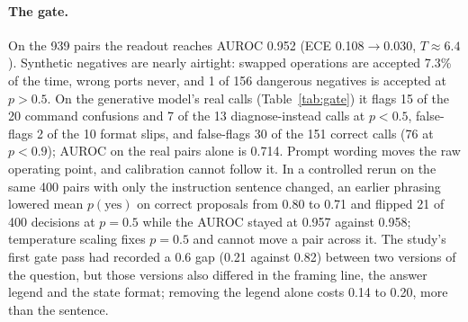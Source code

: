 \documentclass[11pt]{article}
\begin{document}
\paragraph{The gate.} On the 939 pairs the readout reaches AUROC 0.952 (ECE 0.108$\to$0.030,
$T\approx6.4$). Synthetic negatives are nearly airtight: swapped operations are accepted 7.3\%
of the time, wrong ports never, and 1 of 156 dangerous negatives is accepted at $p>0.5$. On the
generative model's real calls (Table~\ref{tab:gate}) it flags 15 of the 20 command confusions
and 7 of the 13 diagnose-instead calls at $p<0.5$, false-flags 2 of the 10 format slips, and
false-flags 30 of the 151 correct calls (76 at $p<0.9$); AUROC on the real pairs alone is 0.714.
Prompt wording moves the raw operating point, and calibration cannot follow it. In a controlled
rerun on the same 400 pairs with only the instruction sentence changed, an earlier phrasing
lowered mean $p(\text{yes})$ on correct proposals from 0.80 to 0.71 and flipped 21 of 400
decisions at $p=0.5$ while the AUROC stayed at 0.957 against 0.958; temperature scaling fixes
$p=0.5$ and cannot move a pair across it. The study's first gate pass had recorded a 0.6 gap
(0.21 against 0.82) between two versions of the question, but those versions also differed in
the framing line, the answer legend and the state format; removing the legend alone costs 0.14 to
0.20, more than the sentence.

\begin{table}[t]\centering\footnotesize\setlength{\tabcolsep}{4pt}
\caption{The gate question, ``does the proposed action do what the operator asked?'', at the
0.5 threshold after out-of-fold temperature scaling. Real pairs are the generative model's own
calls on the 195 paraphrases.}
\label{tab:gate}
\end{table}
\end{document}
